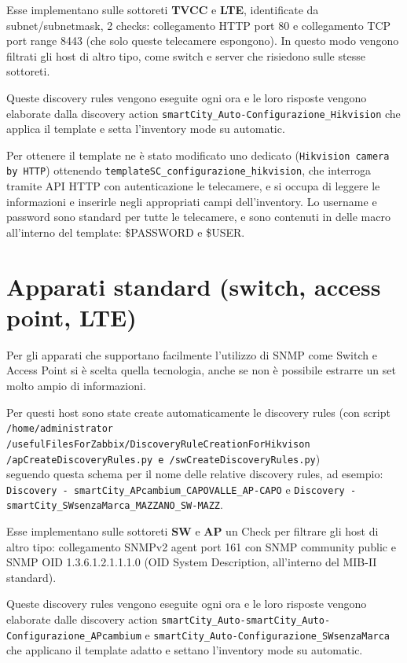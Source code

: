 \documentclass[12pt, a4paper]{report}
\begin{document}
Esse implementano sulle sottoreti \textbf{TVCC} e \textbf{LTE}, identificate da subnet/subnetmask, 2 checks: 
collegamento HTTP port 80 e collegamento TCP port range 8443 (che solo queste telecamere espongono). 
In questo modo vengono filtrati gli host di altro tipo, 
come switch e server che risiedono sulle stesse sottoreti.

Queste discovery rules vengono eseguite ogni ora e le loro risposte vengono elaborate dalla discovery action 
\lstinline|smartCity_Auto-Configurazione_Hikvision| che applica il template e setta l'inventory mode su automatic.

Per ottenere il template ne è stato modificato uno dedicato (\lstinline|Hikvision camera by HTTP|)
ottenendo \lstinline|templateSC_configurazione_hikvision|, che interroga tramite API HTTP con autenticazione le telecamere,
e si occupa di leggere le informazioni e inserirle negli appropriati campi dell'inventory.
Lo username e password sono standard per tutte le telecamere, e sono contenuti in delle macro all'interno del template: {\$PASSWORD} e {\$USER}.

\section{Apparati standard (switch, access point, LTE)}
Per gli apparati che supportano facilmente l'utilizzo di SNMP come Switch e Access Point si è scelta
quella tecnologia, anche se non è possibile estrarre un set molto ampio di informazioni.

Per questi host sono state create automaticamente le discovery rules (con script \texttt{/home/administrator\\/usefulFilesForZabbix/DiscoveryRuleCreationForHikvison\\/apCreateDiscoveryRules.py e /swCreateDiscoveryRules.py})\\
seguendo questa schema per il nome delle relative discovery rules, ad esempio: \\\lstinline|Discovery - smartCity_APcambium_CAPOVALLE_AP-CAPO| 
e \lstinline|Discovery - smartCity_SWsenzaMarca_MAZZANO_SW-MAZZ|.

Esse implementano sulle sottoreti \textbf{SW} e \textbf{AP} un Check per filtrare gli host di altro tipo: 
collegamento SNMPv2 agent port 161 con SNMP community public e SNMP OID 1.3.6.1.2.1.1.1.0 (OID System Description, all'interno del MIB-II standard).

Queste discovery rules vengono eseguite ogni ora e le loro risposte vengono elaborate dalle discovery action 
\lstinline|smartCity_Auto-smartCity_Auto-Configurazione_APcambium| e \lstinline|smartCity_Auto-Configurazione_SWsenzaMarca| 
che applicano il template adatto e settano l'inventory mode su automatic.
\end{document}
